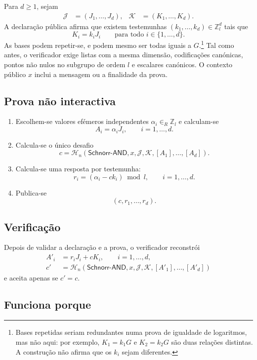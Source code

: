 Para \(d\geq1\), sejam
\begin{align*}
\mathcal J&=(J_1,\ldots,J_d),&
\mathcal K&=(K_1,\ldots,K_d).
\end{align*}
A declaração pública afirma que existem testemunhas
\((k_1,\ldots,k_d)\in\mathbb Z_l^d\) tais que
\[
K_i=k_iJ_i\qquad\text{para todo }i\in\{1,\ldots,d\}.
\]
As bases podem repetir-se, e podem mesmo ser todas iguais a
\(G\).\footnote{Bases repetidas seriam redundantes numa prova de igualdade de
logaritmos, mas não aqui: por exemplo, \(K_1=k_1G\) e \(K_2=k_2G\) são duas
relações distintas. A construção não afirma que os \(k_i\) sejam diferentes.}
Tal como antes, o verificador exige listas com a mesma dimensão, codificações
canónicas, pontos não nulos no subgrupo de ordem \(l\) e escalares canónicos.
O contexto público \(x\) inclui a mensagem ou a finalidade da prova.

\subsection*{Prova não interactiva}

\begin{enumerate}
    \item Escolhem-se valores efémeros independentes
    \(\alpha_i\in_R\mathbb Z_l\) e calculam-se
    \[
    A_i=\alpha_iJ_i,\qquad i=1,\ldots,d.
    \]
    \item Calcula-se o único desafio
    \[
    c=\mathcal H_n(\mathsf{Schnorr\text{-}AND},x,
      \mathcal J,\mathcal K,[A_1],\ldots,[A_d]).
    \]
    \item Calcula-se uma resposta por testemunha:
    \[
    r_i=(\alpha_i-ck_i)\bmod l,\qquad i=1,\ldots,d.
    \]
    \item Publica-se
    \[
    (c,r_1,\ldots,r_d).
    \]
\end{enumerate}

\subsection*{Verificação}

Depois de validar a declaração e a prova, o verificador reconstrói
\begin{align*}
A'_i&=r_iJ_i+cK_i,\qquad i=1,\ldots,d,\\
c'&=\mathcal H_n(\mathsf{Schnorr\text{-}AND},x,
  \mathcal J,\mathcal K,[A'_1],\ldots,[A'_d])
\end{align*}
e aceita apenas se \(c'=c\).

\subsection*{Funciona porque}

